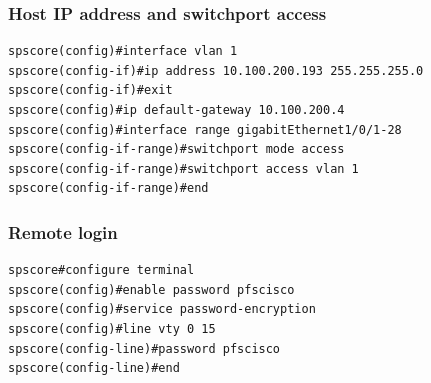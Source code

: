 \documentclass[a4paper,notitlepage]{article}
\begin{document}
\subsubsection{Host IP address and switchport access}

\begin{verbatim}
spscore(config)#interface vlan 1
spscore(config-if)#ip address 10.100.200.193 255.255.255.0
spscore(config-if)#exit
spscore(config)#ip default-gateway 10.100.200.4
spscore(config)#interface range gigabitEthernet1/0/1-28
spscore(config-if-range)#switchport mode access 
spscore(config-if-range)#switchport access vlan 1
spscore(config-if-range)#end
\end{verbatim}

\subsubsection{Remote login}

\begin{verbatim}
spscore#configure terminal
spscore(config)#enable password pfscisco
spscore(config)#service password-encryption 
spscore(config)#line vty 0 15
spscore(config-line)#password pfscisco
spscore(config-line)#end
\end{verbatim}
\end{document}
